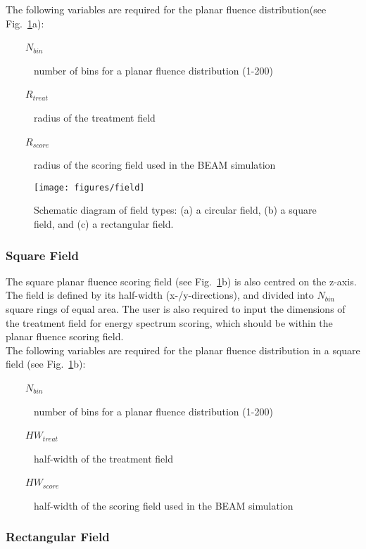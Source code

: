 \documentclass[12pt,twoside]{article}
\begin{document}
The following variables are required for the planar fluence
distribution(see Fig.~\ref{field}a):  \begin{description} \item
[~~~~$N_{bin}$] number of bins for a planar fluence distribution (1-200)
\item [~~~~$R_{treat}$] radius of the treatment field \item
[~~~~$R_{score}$] radius of the scoring field used in the BEAM simulation
\end{description} \begin{figure}[htbp] \begin{center} \leavevmode
\mbox{}
\hspace{0cm}
\texttt{[image: figures/field]}
\caption[]
{Schematic diagram of field types: (a) a circular field, (b) a square
field, and (c) a rectangular field. } \label{field} \end{center}
\end{figure}

\subsubsection{Square Field} The square planar fluence
scoring field (see Fig.~\ref{field}b) is also centred on the z-axis. The
field is defined by its half-width (x-/y-directions), and divided into
$N_{bin}$  square rings of equal area.  The user is also required to input
the dimensions of the treatment field for energy spectrum scoring, which
should be within the planar fluence scoring field.\\

The following variables are required for the planar fluence distribution in a square field (see Fig.~\ref{field}b):
\begin{description}
\item [~~~~$N_{bin}$] number of bins for a planar fluence distribution (1-200)
\item [~~~~$HW_{treat}$] half-width of the treatment field
\item [~~~~$HW_{score}$] half-width of the scoring field used in the BEAM simulation
\end{description}

\subsubsection{Rectangular Field}
\end{document}
